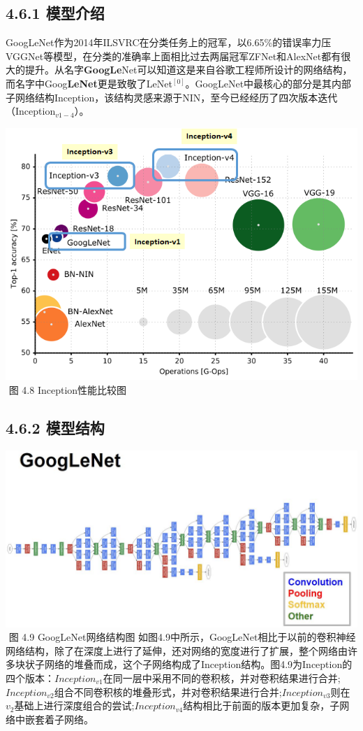 \subsection{4.6.1 模型介绍}\label{ux6a21ux578bux4ecbux7ecd-5}

​
GoogLeNet作为2014年ILSVRC在分类任务上的冠军，以6.65\%的错误率力压VGGNet等模型，在分类的准确率上面相比过去两届冠军ZFNet和AlexNet都有很大的提升。从名字\textbf{GoogLe}Net可以知道这是来自谷歌工程师所设计的网络结构，而名字中Goog\textbf{LeNet}更是致敬了LeNet\(^{[0]}\)。GoogLeNet中最核心的部分是其内部子网络结构Inception，该结构灵感来源于NIN，至今已经经历了四次版本迭代（Inception\(_{v1-4}\)）。

\includegraphics{./img/ch4/img_inception_01.png} ​ 图 4.8
Inception性能比较图

\subsection{4.6.2 模型结构}\label{ux6a21ux578bux7ed3ux6784-5}

\includegraphics{./img/ch4/image25.jpeg} ​ 图 4.9 GoogLeNet网络结构图 ​
如图4.9中所示，GoogLeNet相比于以前的卷积神经网络结构，除了在深度上进行了延伸，还对网络的宽度进行了扩展，整个网络由许多块状子网络的堆叠而成，这个子网络构成了Inception结构。图4.9为Inception的四个版本：\(Inception_{v1}​\)在同一层中采用不同的卷积核，并对卷积结果进行合并;\(Inception_{v2}​\)组合不同卷积核的堆叠形式，并对卷积结果进行合并;\(Inception_{v3}​\)则在\(v_2​\)基础上进行深度组合的尝试;\(Inception_{v4}​\)结构相比于前面的版本更加复杂，子网络中嵌套着子网络。

